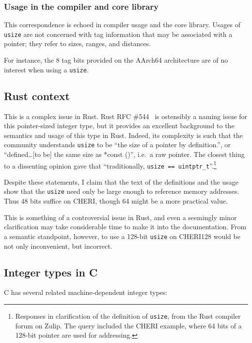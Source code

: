 \documentclass[dissertation.tex]{subfiles}
\begin{document}
\subsubsection{Usage in the compiler and core library}
This correspondence is echoed in compiler usage and the core library.
Usages of \texttt{usize} are not concerned with tag information that may
be associated with a pointer; they refer to sizes, ranges, and
distances.

For instance, the 8 tag bits provided on the AArch64 architecture are of
no interest when using a \texttt{usize}.


\subsection{Rust context}
This is a complex issue in Rust.
Rust RFC \#544~\cite{rust-rfc-isize} is ostensibly a naming issue for
this pointer-sized integer type, but it provides an excellent background
to the semantics and usage of this type in Rust.
Indeed, its complexity is such that the community understands
\texttt{usize} to be ``the size of a pointer by definition.'', or
``defined\ldots[to be] the same size as *const ()'', i.e.\ a raw
pointer.
The closest thing to a dissenting opinion gave that ``traditionally,
\texttt{usize == uintptr\_t}''.\footnote{
Responses in clarification of the definition of \texttt{usize}, from the
Rust compiler forum on Zulip.
The query included the CHERI example, where 64 bits of a 128-bit pointer
are used for addressing.
}

Despite these statements, I claim that the text of the definitions and
the usage show that the \texttt{usize} need only be large enough to
reference memory addresses.
Thus 48 bits suffice on CHERI, though 64 might be a more practical
value.

This is something of a controversial issue in Rust, and even a seemingly
minor clarification may take considerable time to make it into the
documentation.
From a semantic standpoint, however, to use a 128-bit \texttt{usize} on
CHERI128 would be not only inconvenient, but incorrect.


\subsection{Integer types in C}
C has several related machine-dependent integer types:
\end{document}
